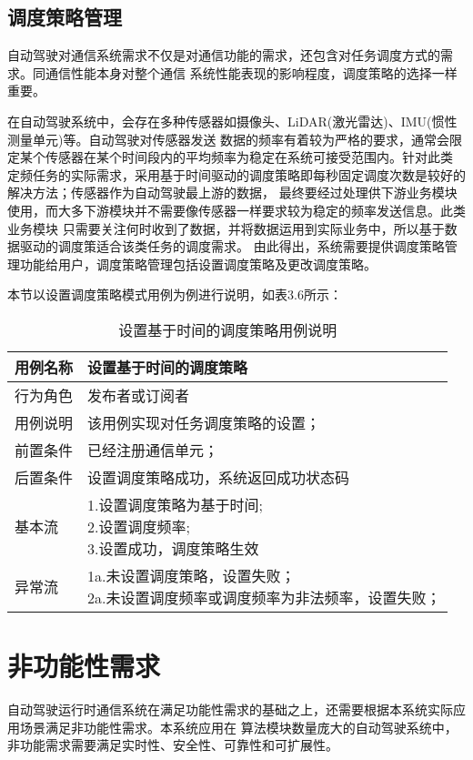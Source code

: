 \subsection{调度策略管理}
自动驾驶对通信系统需求不仅是对通信功能的需求，还包含对任务调度方式的需求。同通信性能本身对整个通信
系统性能表现的影响程度，调度策略的选择一样重要。

在自动驾驶系统中，会存在多种传感器如摄像头、LiDAR(激光雷达)、IMU(惯性测量单元)等。自动驾驶对传感器发送
数据的频率有着较为严格的要求，通常会限定某个传感器在某个时间段内的平均频率为稳定在系统可接受范围内。针对此类
定频任务的实际需求，采用基于时间驱动的调度策略即每秒固定调度次数是较好的解决方法；传感器作为自动驾驶最上游的数据，
最终要经过处理供下游业务模块使用，而大多下游模块并不需要像传感器一样要求较为稳定的频率发送信息。此类业务模块
只需要关注何时收到了数据，并将数据运用到实际业务中，所以基于数据驱动的调度策适合该类任务的调度需求。
由此得出，系统需要提供调度策略管理功能给用户，调度策略管理包括设置调度策略及更改调度策略。

本节以设置调度策略模式用例为例进行说明，如表3.6所示：
\begin{table}[H]
  \centering\small
  \caption{设置基于时间的调度策略用例说明}
  \label{tab:exampletable}
  \begin{tabular}{ll}
    \toprule
    \multicolumn{1}{l}{用例名称} & \multicolumn{1}{l}{设置基于时间的调度策略}  \\
    \midrule
    行为角色 & 发布者或订阅者\\
    用例说明 & 该用例实现对任务调度策略的设置；\\
    前置条件 & 已经注册通信单元；\\
    后置条件 & 设置调度策略成功，系统返回成功状态码\\
    基本流   & \makecell[l]{1.设置调度策略为基于时间;\\2.设置调度频率;\\3.设置成功，调度策略生效}\\
    异常流   & \makecell[l]{1a.未设置调度策略，设置失败；\\2a.未设置调度频率或调度频率为非法频率，设置失败；}\\
    \bottomrule
  \end{tabular}
\end{table}

\section{非功能性需求}
自动驾驶运行时通信系统在满足功能性需求的基础之上，还需要根据本系统实际应用场景满足非功能性需求。本系统应用在
算法模块数量庞大的自动驾驶系统中，非功能需求需要满足实时性、安全性、可靠性和可扩展性。

